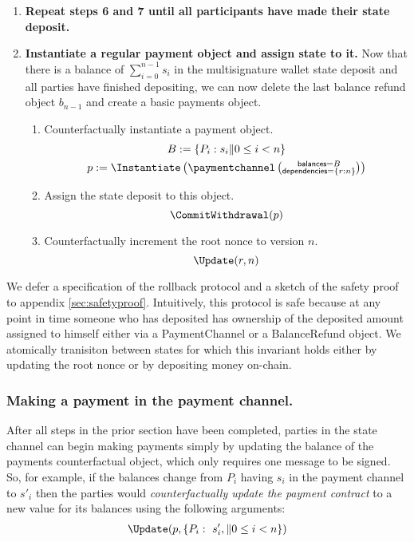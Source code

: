 \documentclass[prb,floatfix,reprint,nofootinbib,amsmath,amssymb,epsfig,pre,floats,letterpaper,groupedaffiliation,tightenlines,allcolors=blue,11pt]{revtex4}
\theoremstyle{definition}
\theoremstyle{definition}
\theoremstyle{definition}
\begin{document}
\begin{enumerate}
\item \textbf{Repeat steps 6 and 7 until all participants have made their state deposit.}

\item \textbf{Instantiate a regular payment object and assign state to it.}
Now that there is a balance of $\sum_{i=0}^{n-1} s_i$ in the multisignature wallet state deposit and all parties have finished depositing, we can now delete the last balance refund object $b_{n-1}$ and create a basic payments object.

\begin{enumerate}

\item Counterfactually instantiate a payment object.
\begin{gather*}
    B := \{P_i:s_i \| 0 \le i < n\} \\
    p := \Instantiate\left(
    \paymentchannel\left(\substack{
    \textsf{balances}=B \\
    \textsf{dependencies}=\left\{r:n\right\}
    }\right)
    \right)
\end{gather*}

\item Assign the state deposit to this object.
\[
\CommitWithdrawal(p)
\]

\item Counterfactually increment the root nonce to version $n$.
\[
\Update(r, n)
\]

\end{enumerate}

\end{enumerate}

We defer a specification of the rollback protocol and a sketch of the safety proof to appendix \ref{sec:safetyproof}. Intuitively, this protocol is safe because at any point in time someone who has deposited has ownership of the deposited amount assigned to himself either via a PaymentChannel or a BalanceRefund object. We atomically tranisiton between states for which this invariant holds either by updating the root nonce or by depositing money on-chain.

\subsubsection{Making a payment in the payment channel.}
After all steps in the prior section have been completed, parties in the state channel can begin making payments simply by updating the balance of the payments counterfactual object, which only requires one message to be signed. So, for example, if the balances change from $P_i$ having $s_i$ in the payment channel to $s'_i$ then the parties would \textit{counterfactually update the payment contract} to a new value for its \textsf{balances} using the following arguments:
\begin{gather*}
    \Update(p, \{P_i:\ s'_i, \| 0 \le i < n \} )
\end{gather*}
\end{document}
